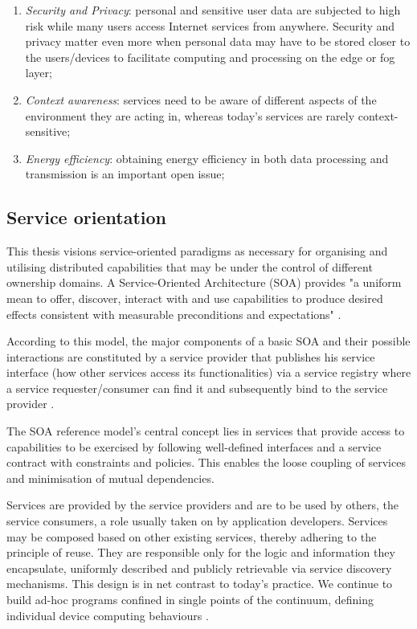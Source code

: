 \begin{enumerate}
    \item \emph{Security and Privacy}: personal and sensitive user data are subjected to high risk while many users access Internet services from anywhere. Security and privacy matter even more when personal data may have to be stored closer to the users/devices to facilitate computing and processing on the edge or fog layer;
    \item \emph{Context awareness}: services need to be aware of different aspects of the environment they are acting in, whereas today's services are rarely context-sensitive;
    \item \emph{Energy efficiency}: obtaining energy efficiency in both data processing and transmission is an important open issue;
\end{enumerate}

\subsection{Service orientation}

This thesis visions service-oriented paradigms as necessary for organising and utilising distributed capabilities that may be under the control of different ownership domains. A Service-Oriented Architecture (SOA) provides "a uniform mean to offer, discover, interact with and use capabilities to produce desired effects consistent with measurable preconditions and expectations" \cite{oasis}.

According to this model, the major components of a basic SOA and their possible interactions are constituted by a service provider that publishes his service interface (how other services access its functionalities) via a service registry where a service requester/consumer can find it and subsequently bind to the service provider \cite{iot-enterprise}.

The SOA reference model's central concept lies in services that provide access to capabilities to be exercised by following well-defined interfaces and a service contract with constraints and policies. This enables the loose coupling of services and minimisation of mutual dependencies.

Services are provided by the service providers and are to be used by others, the service consumers, a role usually taken on by application developers. Services may be composed based on other existing services, thereby adhering to the principle of reuse. They are responsible only for the logic and information they encapsulate, uniformly described and publicly retrievable via service discovery mechanisms. This design is in net contrast to today's practice. We continue to build ad-hoc programs confined in single points of the continuum, defining individual device computing behaviours \cite{harnessing-continuum}.

